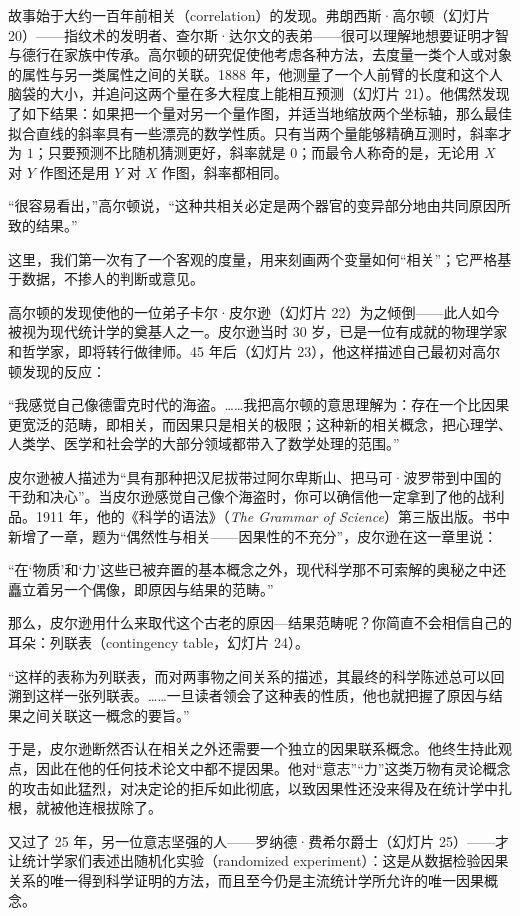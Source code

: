 故事始于大约一百年前相关（correlation）的发现。弗朗西斯·高尔顿（幻灯片 20）——指纹术的发明者、查尔斯·达尔文的表弟——很可以理解地想要证明才智与德行在家族中传承。高尔顿的研究促使他考虑各种方法，去度量一类个人或对象的属性与另一类属性之间的关联。1888 年，他测量了一个人前臂的长度和这个人脑袋的大小，并追问这两个量在多大程度上能相互预测（幻灯片 21）。他偶然发现了如下结果：如果把一个量对另一个量作图，并适当地缩放两个坐标轴，那么最佳拟合直线的斜率具有一些漂亮的数学性质。只有当两个量能够精确互测时，斜率才为 $1$；只要预测不比随机猜测更好，斜率就是 $0$；而最令人称奇的是，无论用 $X$ 对 $Y$ 作图还是用 $Y$ 对 $X$ 作图，斜率都相同。

“很容易看出，”高尔顿说，“这种共相关必定是两个器官的变异部分地由共同原因所致的结果。”

这里，我们第一次有了一个客观的度量，用来刻画两个变量如何“相关”；它严格基于数据，不掺人的判断或意见。

高尔顿的发现使他的一位弟子卡尔·皮尔逊（幻灯片 22）为之倾倒——此人如今被视为现代统计学的奠基人之一。皮尔逊当时 30 岁，已是一位有成就的物理学家和哲学家，即将转行做律师。45 年后（幻灯片 23），他这样描述自己最初对高尔顿发现的反应：

“我感觉自己像德雷克时代的海盗。……我把高尔顿的意思理解为：存在一个比因果更宽泛的范畴，即相关，而因果只是相关的极限；这种新的相关概念，把心理学、人类学、医学和社会学的大部分领域都带入了数学处理的范围。”

皮尔逊被人描述为“具有那种把汉尼拔带过阿尔卑斯山、把马可·波罗带到中国的干劲和决心”。当皮尔逊感觉自己像个海盗时，你可以确信他一定拿到了他的战利品。1911 年，他的《科学的语法》（\textit{The Grammar of Science}）第三版出版。书中新增了一章，题为“偶然性与相关——因果性的不充分”，皮尔逊在这一章里说：

“在‘物质’和‘力’这些已被弃置的基本概念之外，现代科学那不可索解的奥秘之中还矗立着另一个偶像，即原因与结果的范畴。”

那么，皮尔逊用什么来取代这个古老的原因—结果范畴呢？你简直不会相信自己的耳朵：列联表（contingency table，幻灯片 24）。

“这样的表称为列联表，而对两事物之间关系的描述，其最终的科学陈述总可以回溯到这样一张列联表。……一旦读者领会了这种表的性质，他也就把握了原因与结果之间关联这一概念的要旨。”

于是，皮尔逊断然否认在相关之外还需要一个独立的因果联系概念。他终生持此观点，因此在他的任何技术论文中都不提因果。他对“意志”“力”这类万物有灵论概念的攻击如此猛烈，对决定论的拒斥如此彻底，以致因果性还没来得及在统计学中扎根，就被他连根拔除了。

又过了 25 年，另一位意志坚强的人——罗纳德·费希尔爵士（幻灯片 25）——才让统计学家们表述出随机化实验（randomized experiment）：这是从数据检验因果关系的唯一得到科学证明的方法，而且至今仍是主流统计学所允许的唯一因果概念。

